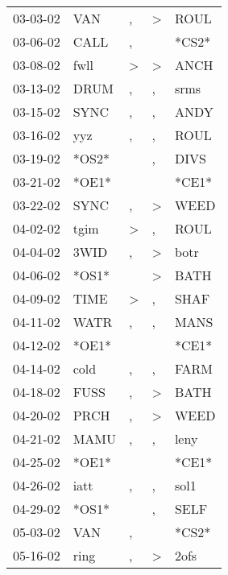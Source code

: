 \begin{supertabular}{lllll}
 03-03-02 &    VAN &                , &     \textgreater &   ROUL \\
 03-06-02 &   CALL &                , &                  &  *CS2* \\
 03-08-02 &   fwll &     \textgreater &     \textgreater &   ANCH \\
 03-13-02 &   DRUM &                , &                , &   srms \\
 03-15-02 &   SYNC &                , &                , &   ANDY \\
 03-16-02 &    yyz &                , &                , &   ROUL \\
 03-19-02 &  *OS2* &                  &                , &   DIVS \\
 03-21-02 &  *OE1* &                  &                  &  *CE1* \\
 03-22-02 &   SYNC &                , &     \textgreater &   WEED \\
 04-02-02 &   tgim &     \textgreater &                , &   ROUL \\
 04-04-02 &   3WID &                , &     \textgreater &   botr \\
 04-06-02 &  *OS1* &                  &     \textgreater &   BATH \\
 04-09-02 &   TIME &     \textgreater &                , &   SHAF \\
 04-11-02 &   WATR &                , &                , &   MANS \\
 04-12-02 &  *OE1* &                  &                  &  *CE1* \\
 04-14-02 &   cold &                , &                , &   FARM \\
 04-18-02 &   FUSS &                , &     \textgreater &   BATH \\
 04-20-02 &   PRCH &                , &     \textgreater &   WEED \\
 04-21-02 &   MAMU &                , &                , &   leny \\
 04-25-02 &  *OE1* &                  &                  &  *CE1* \\
 04-26-02 &   iatt &                , &                , &   sol1 \\
 04-29-02 &  *OS1* &                  &                , &   SELF \\
 05-03-02 &    VAN &                , &                  &  *CS2* \\
 05-16-02 &   ring &                , &     \textgreater &   2ofs \\

\end{supertabular}
